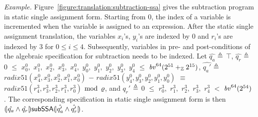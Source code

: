 \noindent
\emph{Example.}
Figure~\ref{figure:translation:subtraction-ssa} gives the subtraction program
 in static single assignment form. Starting from $0$, the
index of a variable is incremented when the variable is assigned to an
expression. After the static single assignment translation, the
variables ${x}_i$'s, ${y}_i$'s are indexed by $0$ and
${r}_i$'s are indexed by $3$ for $0 \leq i \leq 4$.
Subsequently, variables in pre- and post-conditions of the algebraic
specification for subtraction needs to be indexed.
Let $\hat{q_a}$ $\defn$ $\top$, $\hat{q_r}$ $\defn$ $0$ $\leq$ ${x}^0_0,$ ${x}^0_1,$ ${x}^0_2,$ ${x}^0_3,$ ${x}^0_4,$ ${y}^0_0,$ ${y}^0_1,$ ${y}^0_2,$ ${y}^0_3,$ ${y}^0_4$ $\leq$ $\bv^{64}(2^{51} +_\bbfZ 2^{15})$, $\hat{q_a'}$ $\defn$ $\mathit{radix51}({x}^0_4, {x}^0_3, {x}^0_2, {x}^0_1, {x}^0_0)$ $-$ $\mathit{radix51}({y}^0_4, {y}^0_3, {y}^0_2, {y}^0_1, {y}^0_0)$ $\equiv$ $\mathit{radix51}({r}^3_4, {r}^3_3, {r}^3_2, {r}^3_1, {r}^3_0)$ $\mod$ $\myprime$, and $q_r'$ $\defn$ $0$ $\leq$ ${r}^3_0,$ ${r}^3_1,$ ${r}^3_2,$ ${r}^3_3,$ ${r}^3_4$ $<$ $\bv^{64}(2^{54})$.
The corresponding specification in static single assignment form is then $\cond{\hat{q_a} \wedge \hat{q_r}} \dslcode{subSSA} \cond{\hat{q_a'} \wedge \hat{q_r'}}$.

